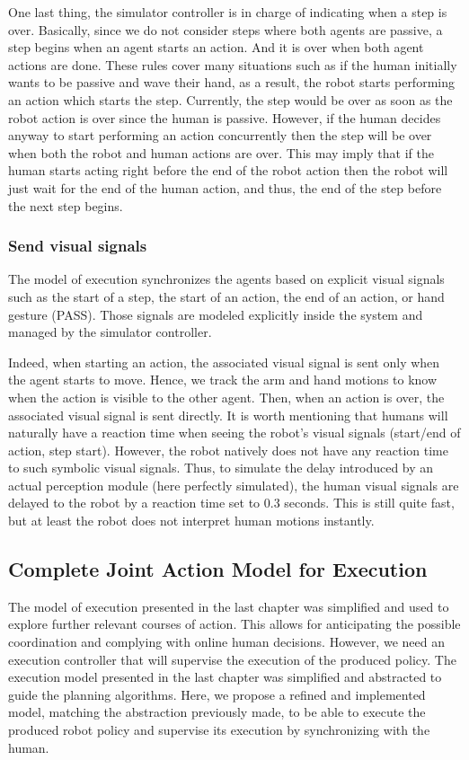 One last thing, the simulator controller is in charge of indicating when a step is over. Basically, since we do not consider steps where both agents are passive, a step begins when an agent starts an action. And it is over when both agent actions are done. These rules cover many situations such as if the human initially wants to be passive and wave their hand, as a result, the robot starts performing an action which starts the step. Currently, the step would be over as soon as the robot action is over since the human is passive. However, if the human decides anyway to start performing an action concurrently then the step will be over when both the robot and human actions are over. This may imply that if the human starts acting right before the end of the robot action then the robot will just wait for the end of the human action, and thus, the end of the step before the next step begins.  

\subsubsection{Send visual signals}

The model of execution synchronizes the agents based on explicit visual signals such as the start of a step, the start of an action, the end of an action, or hand gesture (PASS). Those signals are modeled explicitly inside the system and managed by the simulator controller.

Indeed, when starting an action, the associated visual signal is sent only when the agent starts to move. Hence, we track the arm and hand motions to know when the action is visible to the other agent. Then, when an action is over, the associated visual signal is sent directly. It is worth mentioning that humans will naturally have a reaction time when seeing the robot's visual signals (start/end of action, step start). However, the robot natively does not have any reaction time to such symbolic visual signals. Thus, to simulate the delay introduced by an actual perception module (here perfectly simulated), the human visual signals are delayed to the robot by a reaction time set to 0.3 seconds. This is still quite fast, but at least the robot does not interpret human motions instantly.   

\subsection{Complete Joint Action Model for Execution}

The model of execution presented in the last chapter was simplified and used to explore further relevant courses of action. This allows for anticipating the possible coordination and complying with online human decisions. 
However, we need an execution controller that will supervise the execution of the produced policy. The execution model presented in the last chapter was simplified and abstracted to guide the planning algorithms. Here, we propose a refined and implemented model, matching the abstraction previously made, to be able to execute the produced robot policy and supervise its execution by synchronizing with the human.


